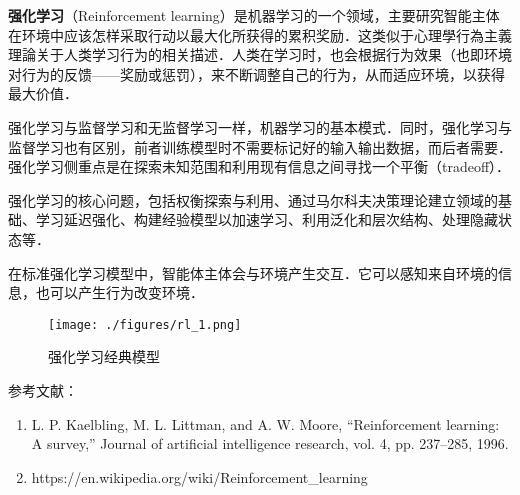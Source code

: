 
\textbf{强化学习}（Reinforcement learning）是机器学习的一个领域，主要研究智能主体在环境中应该怎样采取行动以最大化所获得的累积奖励．这类似于心理學行為主義理論关于人类学习行为的相关描述．人类在学习时，也会根据行为效果（也即环境对行为的反馈——奖励或惩罚），来不断调整自己的行为，从而适应环境，以获得最大价值．

强化学习与监督学习和无监督学习一样，机器学习的基本模式．同时，强化学习与监督学习也有区别，前者训练模型时不需要标记好的输入输出数据，而后者需要．强化学习侧重点是在探索未知范围和利用现有信息之间寻找一个平衡（tradeoff）．

强化学习的核心问题，包括权衡探索与利用、通过马尔科夫决策理论建立领域的基础、学习延迟强化、构建经验模型以加速学习、利用泛化和层次结构、处理隐藏状态等．

在标准强化学习模型中，智能体主体会与环境产生交互．它可以感知来自环境的信息，也可以产生行为改变环境．

\begin{figure}[ht]
\centering
\texttt{[image: ./figures/rl\_1.png]}
\caption{强化学习经典模型} \label{rl_fig1}
\end{figure}


参考文献：
\begin{enumerate}
\item L. P. Kaelbling, M. L. Littman, and A. W. Moore, “Reinforcement learning: A survey,” Journal of artificial intelligence research, vol. 4, pp. 237–285, 1996.
\item https://en.wikipedia.org/wiki/Reinforcement\_learning
\end{enumerate}